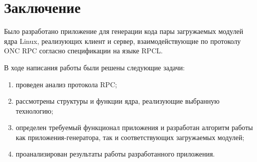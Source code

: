 \section*{Заключение}

Было разработано приложение для генерации кода пары загружаемых модулей ядра
Linux, реализующих клиент и сервер, взаимодействующие по протоколу ONC RPC
согласно спецификации на языке RPCL.

В ходе написания работы были решены следующие задачи:
\begin{enumerate}
    \item проведен анализ протокола RPC;
    \item рассмотрены структуры и функции ядра, реализующие выбранную
          технологию;
    \item определен требуемый функционал приложения и разработан алгоритм
          работы как приложения-генератора, так и соответствующих загружаемых
          модулей;
    \item проанализирован результаты работы разработанного приложения.
\end{enumerate}

